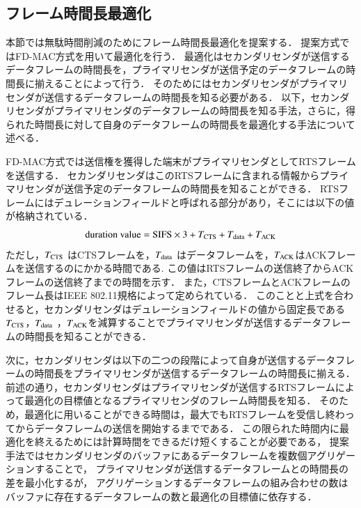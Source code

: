 \documentclass[master]{kuisthesis}		%
\begin{document}
	\subsection{フレーム時間長最適化}\label{sec:frame_opt}
		本節では無駄時間削減のためにフレーム時間長最適化を提案する．
		提案方式ではFD-MAC方式\cite{fdmac}を用いて最適化を行う．
		最適化はセカンダリセンダが送信するデータフレームの時間長を，プライマリセンダが送信予定のデータフレームの時間長に揃えることによって行う．
		そのためにはセカンダリセンダがプライマリセンダが送信するデータフレームの時間長を知る必要がある．
		以下，セカンダリセンダがプライマリセンダのデータフレームの時間長を知る手法，さらに，得られた時間長に対して自身のデータフレームの時間長を最適化する手法について述べる．
		\par
		FD-MAC方式では送信権を獲得した端末がプライマリセンダとしてRTSフレームを送信する．
		セカンダリセンダはこのRTSフレームに含まれる情報からプライマリセンダが送信予定のデータフレームの時間長を知ることができる．
		RTSフレームにはデュレーションフィールドと呼ばれる部分があり，そこには以下の値が格納されている．
		\begin{equation}
			{\rm duration\ value} = {\rm SIFS} \times 3 + T_{{\rm CTS}} + T_{{\rm data}} + T_{{\rm ACK}}
		\end{equation}
		ただし，$T_{\rm CTS}$ はCTSフレームを，$T_{\rm data}$ はデータフレームを，$T_{\rm ACK}$はACKフレームを送信するのにかかる時間である.
		この値はRTSフレームの送信終了からACKフレームの送信終了までの時間を示す．
		また，CTSフレームとACKフレームのフレーム長はIEEE 802.11規格によって定められている．
		このことと上式を合わせると，セカンダリセンダはデュレーションフィールドの値から固定長である$T_{\rm CTS}$，$T_{\rm data}$ ，$T_{\rm ACK}$を減算することでプライマリセンダが送信するデータフレームの時間長を知ることができる．
		\par
		次に，セカンダリセンダは以下の二つの段階によって自身が送信するデータフレームの時間長をプライマリセンダが送信するデータフレームの時間長に揃える．
		前述の通り，セカンダリセンダはプライマリセンダが送信するRTSフレームによって最適化の目標値となるプライマリセンダのフレーム時間長を知る．
		そのため，最適化に用いることができる時間は，最大でもRTSフレームを受信し終わってからデータフレームの送信を開始するまでである．
		この限られた時間内に最適化を終えるためには計算時間をできるだけ短くすることが必要である，
		提案手法ではセカンダリセンダのバッファにあるデータフレームを複数個アグリゲーションすることで，
		プライマリセンダが送信するデータフレームとの時間長の差を最小化するが，
		アグリゲーションするデータフレームの組み合わせの数はバッファに存在するデータフレームの数と最適化の目標値に依存する．
\end{document}
